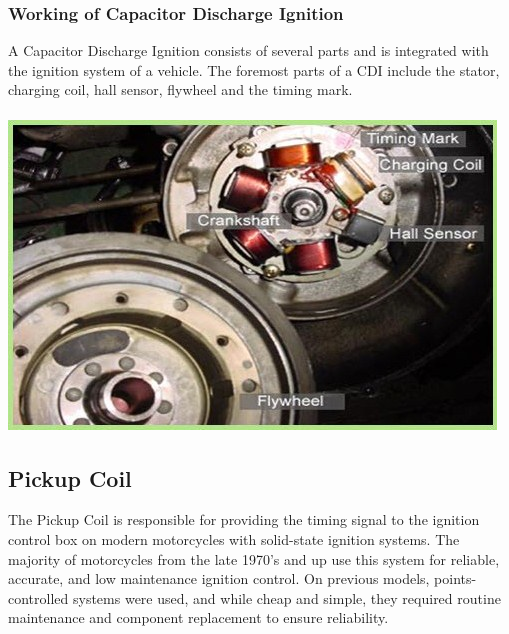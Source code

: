 \documentclass[a4paper]{article}
\begin{document}
\subsubsection{Working of Capacitor Discharge Ignition}
A Capacitor Discharge Ignition consists of several parts and is integrated with the ignition system of
a vehicle. The foremost parts of a CDI include the stator, charging coil, hall sensor, flywheel and the timing mark. \\ \\
\includegraphics[scale=0.6]{SETUP_CDI}
\subsection{Pickup Coil}
The Pickup Coil is responsible for providing the timing signal to the ignition control box on modern motorcycles
with solid-state ignition systems. The majority of motorcycles from the late 1970's and up use this system for reliable, accurate,
and low maintenance ignition control. On previous models, points-controlled systems were used, and while cheap and simple, they required 
routine maintenance and component replacement to ensure reliability.
\end{document}
